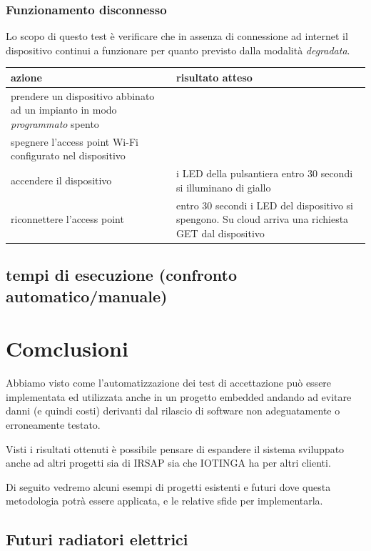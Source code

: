 \documentclass[12pt,a4paper,twoside,titlepage]{book}
\begin{document}
\subsection{Funzionamento disconnesso}

Lo scopo di questo test è verificare che in assenza di connessione ad internet il
dispositivo continui a funzionare per quanto previsto dalla modalità \textit{degradata}.

\begin{center}
\begin{tabular}{| p{5cm} | p{5cm} |}
    \hline \textbf{azione} & \textbf{risultato atteso} \\
    \hline prendere un dispositivo abbinato ad un impianto in modo \textit{programmato} spento & \\
    \hline spegnere l'access point Wi-Fi configurato nel dispositivo & \\
    \hline accendere il dispositivo & i LED della pulsantiera entro 30 secondi si illuminano di giallo \\
    \hline riconnettere l'access point & entro 30 secondi i LED del dispositivo si spengono. Su cloud arriva una richiesta GET dal dispositivo \\
    \hline
\end{tabular}
\end{center}

\section{tempi di esecuzione (confronto automatico/manuale)}

\chapter{Comclusioni}

Abbiamo visto come l'automatizzazione dei test di accettazione può essere implementata
ed utilizzata anche in un progetto embedded andando ad evitare danni (e quindi costi)
derivanti dal rilascio di software non adeguatamente o erroneamente testato.

Visti i risultati ottenuti è possibile pensare di espandere il sistema sviluppato
anche ad altri progetti sia di IRSAP sia che IOTINGA ha per altri clienti.

Di seguito vedremo alcuni esempi di progetti esistenti e futuri dove questa metodologia
potrà essere applicata, e le relative sfide per implementarla.

\section{Futuri radiatori elettrici}
\end{document}
